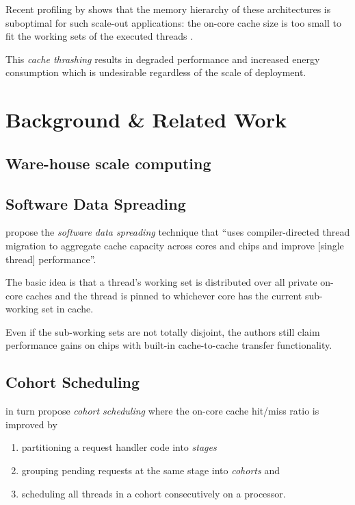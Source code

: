 \documentclass{article}
\begin{document}
Recent profiling by \citeauthor{kanev2015profiling} shows that the memory hierarchy of these architectures
is suboptimal for such scale-out applications:
the on-core cache size is too small to fit the working sets of the executed threads \cite{kanev2015profiling}.

This \textit{cache thrashing} results in degraded performance and increased energy consumption
which is undesirable regardless of the scale of deployment.

\section{Background \& Related Work}\label{relatedwork}

\subsection{Ware-house scale computing}
\subsection{Software Data Spreading}
\citeauthor{sodaspr} propose the \textit{software data spreading} technique that
``uses compiler-directed thread migration to aggregate cache capacity across cores and chips and improve [single thread] performance''\cite{sodaspr}.

The basic idea is that a thread's working set is distributed over all private on-core caches
and the thread is pinned to whichever core has the current sub-working set in cache.

Even if the sub-working sets are not totally disjoint, the authors still claim performance gains
on chips with built-in cache-to-cache transfer functionality.

\subsection{Cohort Scheduling}
\citeauthor{cohort} in turn propose \textit{cohort scheduling} where the on-core cache hit/miss ratio is improved by
\begin{enumerate}
\item partitioning a request handler code into \textit{stages}
\item grouping pending requests at the same stage into \textit{cohorts} and
\item scheduling all threads in a cohort consecutively on a processor.
\end{enumerate}
\end{document}
